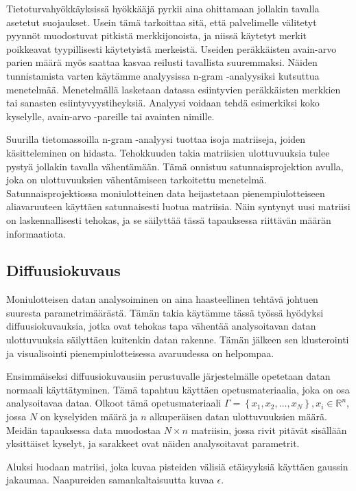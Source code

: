 Tietoturvahyökkäyksissä hyökkääjä pyrkii aina ohittamaan jollakin tavalla asetetut suojaukset. Usein tämä tarkoittaa sitä, että palvelimelle välitetyt pyynnöt muodostuvat pitkistä merkkijonoista, ja niissä käytetyt
merkit poikkeavat tyypillisesti käytetyistä merkeistä. Useiden peräkkäisten avain-arvo parien määrä myös saattaa kasvaa reilusti tavallista suuremmaksi. Näiden tunnistamista varten käytämme analyysissa n-gram -analyysiksi
kutsuttua menetelmää. Menetelmällä lasketaan datassa esiintyvien peräkkäisten merkkien tai sanasten esiintyvyystiheyksiä. Analyysi voidaan tehdä esimerkiksi koko kyselylle, avain-arvo -pareille tai avainten nimille. 

Suurilla tietomassoilla n-gram -analyysi tuottaa isoja matriiseja, joiden käsitteleminen on hidasta. Tehokkuuden takia matriisien ulottuvuuksia tulee pystyä jollakin tavalla vähentämään. Tämä onnistuu satunnaisprojektion 
avulla, joka on ulottuvuuksien vähentämiseen tarkoitettu menetelmä. Satunnaisprojektiossa moniulotteinen data heijastetaan pienempiulotteiseen aliavaruuteen käyttäen satunnaisesti luotua matriisia. Näin syntynyt uusi 
matriisi on laskennallisesti tehokas, ja se säilyttää tässä tapauksessa riittävän määrän informaatiota. 

\subsection{Diffuusiokuvaus}

Moniulotteisen datan analysoiminen on aina haasteellinen tehtävä johtuen suuresta parametrimäärästä. Tämän takia käytämme tässä työssä hyödyksi diffuusiokuvauksia, jotka ovat tehokas tapa vähentää analysoitavan datan
ulottuvuuksia säilyttäen kuitenkin datan rakenne. Tämän jälkeen sen klusterointi ja visualisointi pienempiulotteisessa avaruudessa on helpompaa.

Ensimmäiseksi diffuusiokuvausiin perustuvalle järjestelmälle opetetaan datan normaali käyttätyminen. Tämä tapahtuu käyttäen opetusmateriaalia, joka on osa analysoitavaa dataa. Olkoot tämä opetusmateriaali 
$\Gamma = \left\{ x_1, x_2, \dots , x_N \right\}, x_i \in \mathbb{R}^n$, jossa $N$ on kyselyiden määrä ja $n$ alkuperäisen datan ulottuvuuksien määrä. Meidän tapauksessa data muodostaa $N \times n$ matriisin, jossa 
rivit pitävät sisällään yksittäiset kyselyt, ja sarakkeet ovat näiden analysoitavat parametrit.

Aluksi luodaan matriisi, joka kuvaa pisteiden välisiä etäisyyksiä käyttäen gaussin jakaumaa. Naapureiden samankaltaisuutta kuvaa $\epsilon$. 

